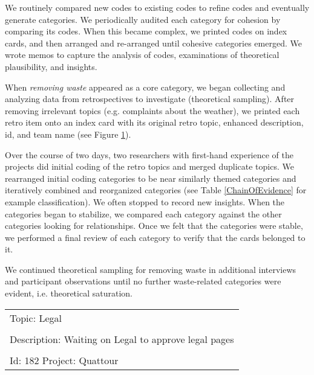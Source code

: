We routinely compared new codes to existing codes to refine codes and eventually generate categories. We periodically audited each category for cohesion by comparing its codes. When this became complex, we printed codes on index cards, and then arranged and re-arranged until cohesive categories emerged. We wrote memos to capture the analysis of codes, examinations of theoretical plausibility, and insights.

When \textit{removing waste} appeared as a core category, we began collecting and analyzing data from retrospectives to investigate (theoretical sampling). After removing irrelevant topics (e.g. complaints about the weather), we printed each retro item onto an index card with its original retro topic, enhanced description, id, and team name (see Figure \ref{exampleRetroTopicl}).

Over the course of two days, two researchers with first-hand experience of the projects did initial coding of the retro topics and merged duplicate topics. We rearranged initial coding categories to be near similarly themed categories and iteratively combined and reorganized categories (see Table \ref{ChainOfEvidence} for example classification). We often stopped to record new insights. When the categories began to stabilize, we compared each category against the other categories looking for relationships. Once we felt that the categories were stable, we performed a final review of each category to verify that the cards belonged to it. 

We continued theoretical sampling for removing waste in additional interviews and participant observations until no further waste-related categories were evident, i.e. theoretical saturation. 


\begin{table}[t]
\renewcommand{\arraystretch}{1.5}
\centering
{}
\label{exampleRetroTopicl}
\begin{tabular}{|l|}
\hline
Topic: Legal \\ \\ Description: Waiting on Legal to approve legal pages \\ \\ Id: 182 Project: Quattour\\ \hline
\end{tabular}
\end{table}








